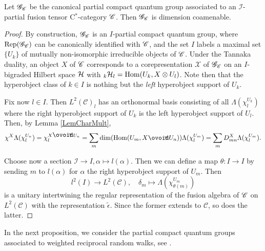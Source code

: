 \begin{Prop} Let $\mathscr{G}_{\mathscr{C}}$ be the canonical partial compact quantum group associated to an $\mathcal{I}$-partial fusion tensor C$^*$-category $\mathscr{C}$. Then $\mathscr{G}_{\mathscr{C}}$ is dimension coamenable.  
\end{Prop}%
\begin{proof} 
  By construction, $\mathscr{G}_{\mathscr{C}}$ is an $I$-partial compact quantum group, where $\mathrm{Rep}(\mathscr{G}_{\mathscr{C}})$ can be canonically
  identified with $\mathscr{C}$, and the set $I$ labels a maximal set
  $\{U_{k}\}$ of mutually non-isomorphic irreducible objects of
  $\mathscr{C}$.  Under the Tannaka duality, an object $X$ of $\mathscr{C}$ corresponds to a corepresentation $\mathscr{X}$ of $\mathscr{G}_{\mathscr{C}}$ on an $I$-bigraded Hilbert space $\mathcal{H}$ with ${}_{k}\mathcal{H}_{l} = \operatorname{Hom}(U_k,X\otimes U_l)$. Note then that the hyperobject class of $k\in I$ is nothing but the \emph{left} hyperobject support of $U_k$. %
  
  Fix now $l\in I$. Then $L^2(\mathcal{C})_l$ has an orthonormal basis consisting of all $\Lambda(\chi_{l}^{U_k})$ where the right hyperobject support of $U_k$ is the left hyperobject support of $U_l$. Then, by
  Lemma \ref{LemCharMult}, 
  \begin{align*}
 \chi^{X}\Lambda(\chi^{U_{n}}_{l}) = \chi^{X \Circt U_{n}}_{l} = \sum_{m}
 \dim(\Hom(U_{m},X\Circt U_{n})) \Lambda(\chi^{U_{m}}_{l}) = \sum_{m}
 D^{X}_{mn} \Lambda(\chi^{U_{m}}_{l}).
  \end{align*}
  
  Choose now a section $\mathcal{I} \rightarrow I, \alpha \mapsto l(\alpha)$. Then we can define a map $\theta:I\rightarrow I$ by sending $m$ to $l(\alpha)$ for $\alpha$ the right hyperobject support of $U_m$. Then \[l^2(I)\rightarrow L^2(\mathcal{C}),\quad \delta_m\mapsto \Lambda(\chi_{\theta(m)}^{U_m})\] is a unitary intertwining the regular representation of the fusion algebra of $\mathscr{C}$ on $L^2(\mathcal{C})$ with the
representation $\tilde \epsilon$. Since the former extends to
$\mathcal{C}$, so does the latter.
 \end{proof}
 
 In the next proposition, we consider the partial compact quantum groups associated to weighted reciprocal random walks, see \cite[Section 5]{DCT1}. 
 
